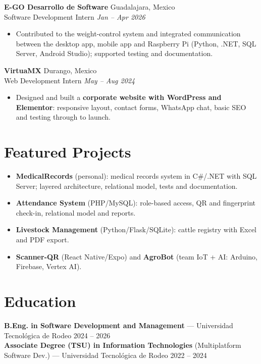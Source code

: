\documentclass[10pt,a4paper]{article}
\newcommand{\entry}[4]{%
  \textbf{#1} \hfill {\color{muted}\small #2}\\[0pt]
  {\color{accent}\small #3} \hfill {\color{muted}\itshape\small #4}\\[1pt]
}
\begin{document}
\entry{E-GO Desarrollo de Software}{Guadalajara, Mexico}{Software Development Intern}{Jan -- Apr 2026}
\begin{itemize}
  \item Contributed to the weight-control system and integrated communication between the desktop app, mobile app and Raspberry Pi (Python, .NET, SQL Server, Android Studio); supported testing and documentation.
\end{itemize}

\entry{VirtuaMX}{Durango, Mexico}{Web Development Intern}{May -- Aug 2024}
\begin{itemize}
  \item Designed and built a \textbf{corporate website with WordPress and Elementor}: responsive layout, contact forms, WhatsApp chat, basic SEO and testing through to launch.
\end{itemize}

\section{Featured Projects}
\begin{itemize}
  \item \textbf{MedicalRecords} (personal): medical records system in C\#/.NET with SQL Server; layered architecture, relational model, tests and documentation.
  \item \textbf{Attendance System} (PHP/MySQL): role-based access, QR and fingerprint check-in, relational model and reports.
  \item \textbf{Livestock Management} (Python/Flask/SQLite): cattle registry with Excel and PDF export.
  \item \textbf{Scanner-QR} (React Native/Expo) and \textbf{AgroBot} (team IoT + AI: Arduino, Firebase, Vertex AI).
\end{itemize}

\section{Education}
\textbf{B.Eng. in Software Development and Management} --- Universidad Tecnológica de Rodeo \hfill {\color{muted}\small 2024 -- 2026}\\[1pt]
\textbf{Associate Degree (TSU) in Information Technologies} (Multiplatform Software Dev.) --- Universidad Tecnológica de Rodeo \hfill {\color{muted}\small 2022 -- 2024}
\end{document}
